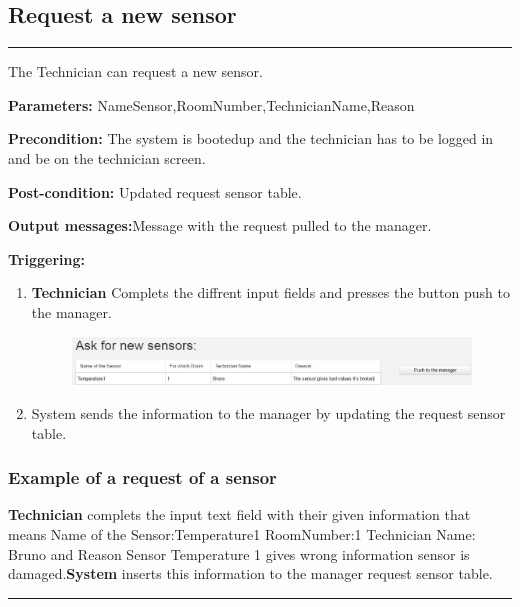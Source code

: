

\subsection{Request a new sensor}

\hrule
\hfill
\vspace{0.5cm}
\label{operation:Request a new sensor}

The Technician can request a new sensor.
\begin{description}
\item \textbf{Parameters:} NameSensor,RoomNumber,TechnicianName,Reason
\item \textbf{Precondition:} The system is bootedup and the technician has to be
logged in and be on the technician screen.
\item \textbf{Post-condition:} Updated request sensor table.
\item \textbf{Output messages:}Message with the request pulled to the manager.
\item \textbf{Triggering:}
\begin{enumerate}
\item \textbf{Technician} Complets the diffrent input fields and presses the
button push to the manager.
\begin{figure}[H]
\includegraphics[width=1\textwidth]{images/AskForANewSensor.eps}
\end{figure}
\item System sends the information to the manager by updating the request
sensor table.
\end{enumerate}
\end{description}

\subsubsection{Example of a request of a sensor}
\textbf{Technician} complets the input text field with their given information
that means Name of the Sensor:Temperature1 RoomNumber:1 Technician Name: Bruno
and Reason Sensor Temperature 1 gives wrong information sensor is
damaged.\textbf{System} inserts this information to the manager request sensor
table.
\hfill
\vspace{0.5cm}
\hrule



